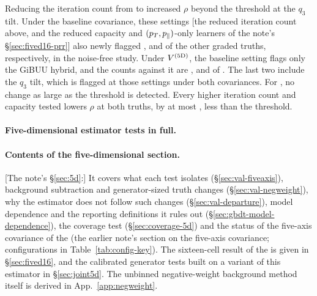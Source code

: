 Reducing the iteration count from  to  increased $\rho$ beyond the threshold at the $q_3$ tilt. Under the baseline covariance, these settings [the reduced iteration count above, and the reduced capacity and $(p_{T},p_{\parallel})$-only learners of the note's \S\ref{sec:fived16-prr}] also newly flagged ,  and  of the other  graded truths, respectively, in the noise-free study. Under $V^{(5\mathrm{D})}$, the baseline setting flags only the GiBUU hybrid, and the counts against it are ,  and  of . The last two include the $q_3$ tilt, which is flagged at those settings under both covariances. For , no change as large as the threshold is detected. Every higher iteration count and capacity tested lowers $\rho$ at both truths, by at most , less than the threshold.

\paragraph{Five-dimensional estimator tests in full.}

\paragraph{Contents of the five-dimensional section.} [The note's \S\ref{sec:5d}:] It covers what each test isolates (\S\ref{sec:val-fiveaxis}), background subtraction and generator-sized truth changes (\S\ref{sec:val-negweight}), why the estimator does not follow such changes (\S\ref{sec:val-departure}), model dependence and the reporting definitions it rules out (\S\ref{sec:gbdt-model-dependence}), the coverage test (\S\ref{sec:coverage-5d}) and the status of the five-axis covariance of the \resFiveAxis{} (the earlier note's section on the five-axis covariance; configurations in Table~\ref{tab:config-key}). The sixteen-cell result of the \estMultiD{} is given in \S\ref{sec:fived16}, and the calibrated generator tests built on a variant of this estimator in \S\ref{sec:joint5d}. The unbinned negative-weight background method itself is derived in App.~\ref{app:negweight}.

